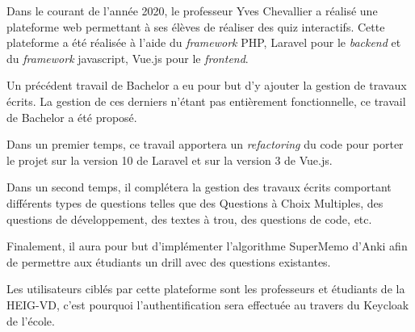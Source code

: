 Dans le courant de l'année 2020, le professeur Yves Chevallier a réalisé une plateforme web permettant à ses élèves de réaliser des quiz interactifs. Cette plateforme a été réalisée à l'aide du \emph{framework} PHP, Laravel pour le \emph{backend} et du \emph{framework} javascript, Vue.js pour le \emph{frontend}.

Un précédent travail de Bachelor a eu pour but d'y ajouter la gestion de travaux écrits. La gestion de ces derniers n'étant pas entièrement fonctionnelle, ce travail de Bachelor a été proposé.

Dans un premier temps, ce travail apportera un \emph{refactoring} du code pour porter le projet sur la version 10 de Laravel et sur la version 3 de Vue.js.

Dans un second temps, il complétera la gestion des travaux écrits comportant différents types de questions telles que des Questions à Choix Multiples, des questions de développement, des textes à trou, des questions de code, etc.

Finalement, il aura pour but d'implémenter l'algorithme SuperMemo d'Anki afin de permettre aux étudiants un drill avec des questions existantes.

Les utilisateurs ciblés par cette plateforme sont les professeurs et étudiants de la HEIG-VD, c'est pourquoi l'authentification sera effectuée au travers du Keycloak de l'école.

\asterism
